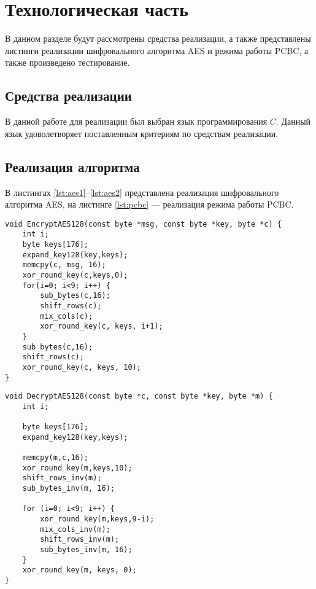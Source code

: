 \chapter{Технологическая часть}

В данном разделе будут рассмотрены средства реализации, а также представлены листинги реализации шифровального алгоритма AES и режима работы PCBC, а также произведено тестирование.

\section{Средства реализации}
В данной работе для реализации был выбран язык программирования $C$. Данный язык удоволетворяет поставленным критериям по средствам реализации.

\section{Реализация алгоритма}

В листингах \ref{lst:aes1}--\ref{lst:aes2} представлена реализация шифровального алгоритма AES, на листинге \ref{lst:pcbc} --- реализация режима работы PCBC.

\begin{center}
    \captionsetup{justification=raggedright,singlelinecheck=off}
    \begin{lstlisting}[label=lst:aes1,caption=Реализация шифровального  алгоритма AES, шифровка]
void EncryptAES128(const byte *msg, const byte *key, byte *c) {
    int i;
    byte keys[176];
    expand_key128(key,keys);
    memcpy(c, msg, 16);
    xor_round_key(c,keys,0);
    for(i=0; i<9; i++) {
        sub_bytes(c,16);
        shift_rows(c);
        mix_cols(c);
        xor_round_key(c, keys, i+1);
    }
    sub_bytes(c,16);
    shift_rows(c);
    xor_round_key(c, keys, 10);
}
\end{lstlisting}
\end{center}


\begin{center}
    \captionsetup{justification=raggedright,singlelinecheck=off}
    \begin{lstlisting}[label=lst:aes2,caption=Реализация шифровального  алгоритма AES расшифровка]
void DecryptAES128(const byte *c, const byte *key, byte *m) {
    int i;

    byte keys[176];
    expand_key128(key,keys);

    memcpy(m,c,16);
    xor_round_key(m,keys,10);
    shift_rows_inv(m);
    sub_bytes_inv(m, 16);

    for (i=0; i<9; i++) {
        xor_round_key(m,keys,9-i);
        mix_cols_inv(m);
        shift_rows_inv(m);
        sub_bytes_inv(m, 16);
    }
    xor_round_key(m, keys, 0);
}
\end{lstlisting}
\end{center}

